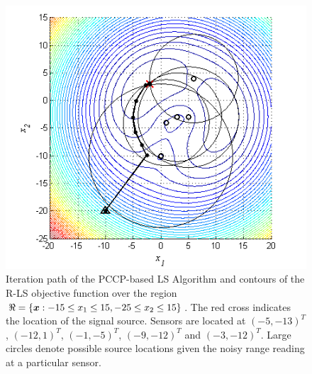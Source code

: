 \begin{figure} 
\centering
\includegraphics{figures/ccp/iteration_path2}
\caption{Iteration path of the PCCP-based LS Algorithm and contours of the R-LS objective function over the region $\protect\Re = \protect\lbrace \protect\mbox{\boldmath$x$}:-15\protect\leq x_1 \protect\leq 15, -25\protect\leq x_2 \protect\leq 15 \protect\rbrace$. The red cross indicates the location of the signal source. Sensors are located at $(-5, -13)^T$, $(-12, 1)^T$, $(-1, -5)^T$, $(-9, -12)^T$ and  $(-3, -12)^T$. Large circles denote possible source locations given the noisy range reading at a particular sensor.}
\label{fig:hyperbola}
\end{figure}
 


